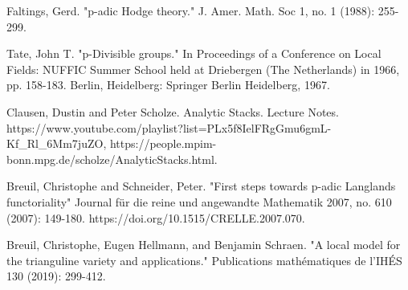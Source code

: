 \documentclass[12pt]{book}
\begin{document}
\begin{thebibliography}{}
 Faltings, Gerd. "p-adic Hodge theory." J. Amer. Math. Soc 1, no. 1 (1988): 255-299.

 Tate, John T. "p-Divisible groups." In Proceedings of a Conference on Local Fields: NUFFIC Summer School held at Driebergen (The Netherlands) in 1966, pp. 158-183. Berlin, Heidelberg: Springer Berlin Heidelberg, 1967.







 Clausen, Dustin and Peter Scholze. Analytic Stacks. Lecture Notes. https://www.youtube.com/playlist?list=PLx5f8IelFRgGmu6gmL-Kf\_Rl\_6Mm7juZO, https://people.mpim-bonn.mpg.de/scholze/AnalyticStacks.html.


 Breuil, Christophe and Schneider, Peter. "First steps towards p-adic Langlands functoriality" Journal f\"ur die reine und angewandte Mathematik 2007, no. 610 (2007): 149-180. https://doi.org/10.1515/CRELLE.2007.070.




 Breuil, Christophe, Eugen Hellmann, and Benjamin Schraen. "A local model for the trianguline variety and applications." Publications math\'ematiques de l'IH\'ES 130 (2019): 299-412.







\end{thebibliography}
\end{document}

